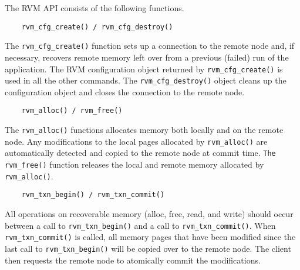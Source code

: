 The RVM API consists of the following functions.

\begin{verbatim}
    rvm_cfg_create() / rvm_cfg_destroy()
\end{verbatim}

The \verb|rvm_cfg_create()| function sets up a connection to the remote node and, if necessary, recovers remote memory left over from a previous (failed) run of the application. The RVM configuration object returned by \verb|rvm_cfg_create()| is used in all the other commands. The \verb|rvm_cfg_destroy()| object cleans up the configuration object and closes the connection to the remote node.

\begin{verbatim}
    rvm_alloc() / rvm_free()
\end{verbatim}

    The \verb|rvm_alloc()| functions allocates memory both locally and on the remote node. Any modifications to the local pages allocated by \verb|rvm_alloc()| are automatically detected and copied to the remote node at commit time. \verb|The rvm_free()| function releases the local and remote memory allocated by \verb|rvm_alloc()|.

\begin{verbatim}
    rvm_txn_begin() / rvm_txn_commit()
\end{verbatim}

    All operations on recoverable memory (alloc, free, read, and write) should occur between a call to \verb|rvm_txn_begin()| and a call to \verb|rvm_txn_commit()|. When \verb|rvm_txn_commit()| is called, all memory pages that have been modified since the last call to \verb|rvm_txn_begin()| will be copied over to the remote node. The client then requests the remote node to atomically commit the modifications.


